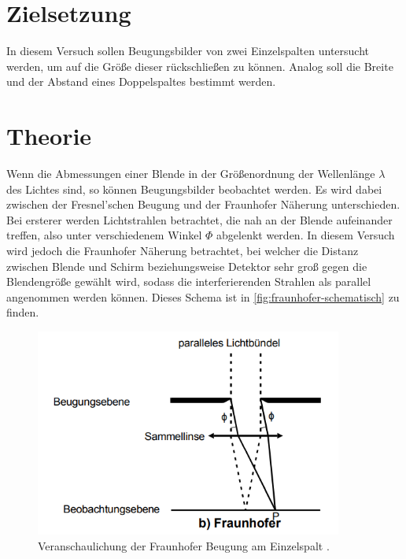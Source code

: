 \section{Zielsetzung}

In diesem Versuch sollen Beugungsbilder von zwei Einzelspalten untersucht werden, um auf die Größe dieser rückschließen zu können.
Analog soll die Breite und der Abstand eines Doppelspaltes bestimmt werden.


\section{Theorie}
\label{sec:Theorie}

Wenn die Abmessungen einer Blende in der Größenordnung der Wellenlänge $\lambda$ des Lichtes sind, so können Beugungsbilder beobachtet werden.
Es wird dabei zwischen der Fresnel'schen Beugung und der Fraunhofer Näherung unterschieden.
Bei ersterer werden Lichtstrahlen betrachtet, die nah an der Blende aufeinander treffen, also unter verschiedenem Winkel $\Phi$ abgelenkt werden.
In diesem Versuch wird jedoch die Fraunhofer Näherung betrachtet, bei welcher die Distanz zwischen Blende und Schirm beziehungsweise Detektor sehr groß gegen die Blendengröße gewählt wird,
sodass die interferierenden Strahlen als parallel angenommen werden können. Dieses Schema ist in \autoref{fig:fraunhofer-schematisch} zu finden.

\begin{figure}
    \centering
    \includegraphics[width=0.9\textwidth]{content/fraunhofer-schematisch.png}
    \caption{Veranschaulichung der Fraunhofer Beugung am Einzelspalt \cite{V406}.}
    \label{fig:fraunhofer-schematisch}
\end{figure}

